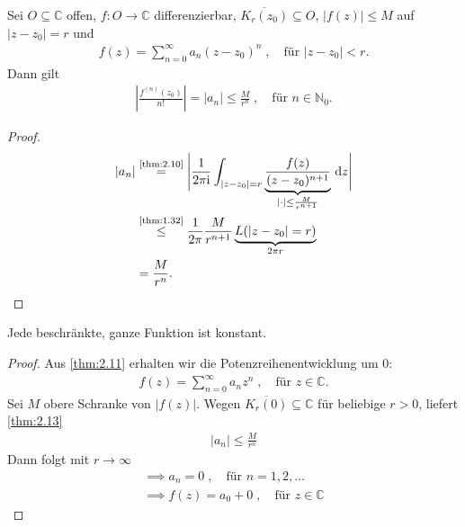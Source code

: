 \begin{theorem} \label{thm:2.13}
  Sei $O \subseteq \mathbb{C}$ offen, $f:O \to \mathbb{C}$ differenzierbar, $\overline{K_r(z_0)} \subseteq O$, $|f(z)| \leq M$ auf $|z-z_0| = r$ und
  \begin{align*}
    f(z) = \sum\limits_{n=0}^{\infty} a_n (z-z_0)^n \; , \quad \text{für } |z-z_0| < r.
  \end{align*}
  Dann gilt
  \begin{align*}
    \left| \frac{f^{(n)}(z_0)}{n!} \right| = |a_n| \leq \frac{M}{r^n} \; , \quad \text{für } n \in \mathbb{N}_0.
  \end{align*}
  
  \begin{proof}
    \begin{align*}
      |a_n| &\overset{\text{\ref{thm:2.10}}}{=} \Bigg| \frac{1}{2 \pi \mathrm{i}} \int_{|z-z_0| = r} \underbrace{\frac{f(z)}{(z-z_0)^{n+1}}}_{|\cdot| \leq \frac{M}{r^{n+1}}} \, \mathrm{d}z \Bigg| \\
      &\overset{\text{\ref{thm:1.32}}}{\leq} \frac{1}{2 \pi} \frac{M}{r^{n+1}} \underbrace{L(|z-z_0| = r)}_{2 \pi r} \\
      &= \frac{M}{r^n}.
    \end{align*}
  \end{proof}
\end{theorem}

\begin{theorem}
  Jede beschränkte, ganze Funktion ist konstant.
  
  \begin{proof}
    Aus \ref{thm:2.11} erhalten wir die Potenzreihenentwicklung um $0$:
    \begin{align*}
      f(z) = \sum\limits_{n=0}^{\infty} a_n z^n \; , \quad \text{für } z \in \mathbb{C}.
    \end{align*}
    Sei $M$ obere Schranke von $|f(z)|$. 
    Wegen $\overline{K_r(0)} \subseteq \mathbb{C}$ für beliebige $r>0$, liefert \ref{thm:2.13}
    \begin{align*}
      |a_n| \leq \frac{M}{r^n} 
    \end{align*}
    Dann folgt mit $r \to \infty$
    \begin{gather*}
      \implies a_n = 0 \; , \quad \text{für } n = 1, 2, \ldots \\
      \implies f(z) = a_0 + 0  \; , \quad \text{für } z \in \mathbb{C}
    \end{gather*}
  \end{proof}
\end{theorem}

